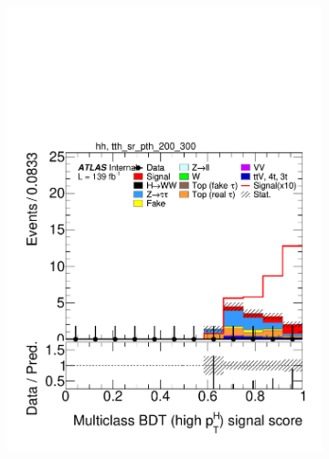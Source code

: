 \begin{figure}[h]
\begin{subfigure}[b]{0.32\textwidth}
    \includegraphics[width=\textwidth]{images/sr_cr_plots/plot_tth_signal_multiclass_gt200_hh_tth_sr_pth_200_300.pdf}
    \caption{}
  \end{subfigure}
  \begin{subfigure}[b]{0.32\textwidth}

\end{subfigure}
\end{figure}
